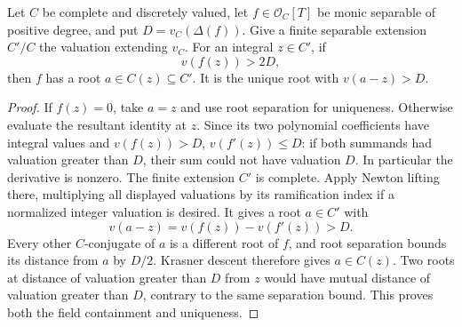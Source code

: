 \begin{lemma}
\label{fw:separable-exact-root-extraction}
\leanok
Let $C$ be complete and discretely valued, let
$f\in\mathcal O_C[T]$ be monic separable of positive degree, and put
$D=v_C(\Delta(f))$. Give a finite separable extension $C'/C$ the
valuation extending $v_C$. For an integral $z\in C'$, if
\[
 v(f(z))>2D,
\]
then $f$ has a root $a\in C(z)\subseteq C'$. It is the unique root
with $v(a-z)>D$.
\end{lemma}
\begin{proof}
If $f(z)=0$, take $a=z$ and use root separation for uniqueness.
Otherwise evaluate the resultant identity at $z$. Since its two
polynomial coefficients have integral values and $v(f(z))>D$,
$v(f'(z))\leq D$: if both summands had valuation greater than $D$,
their sum could not have valuation $D$. In particular the derivative
is nonzero. The finite extension $C'$ is complete. Apply Newton
lifting there, multiplying all displayed valuations by its
ramification index if a normalized integer valuation is desired.
It gives a root $a\in C'$ with
\[
 v(a-z)=v(f(z))-v(f'(z))>D.
\]
Every other $C$-conjugate of $a$ is a different root of $f$, and root
separation bounds its distance from $a$ by $D/2$. Krasner descent
therefore gives $a\in C(z)$. Two roots at distance of valuation
greater than $D$ from $z$ would have mutual distance of valuation
greater than $D$, contrary to the same separation bound. This proves
both the field containment and uniqueness.
\end{proof}

